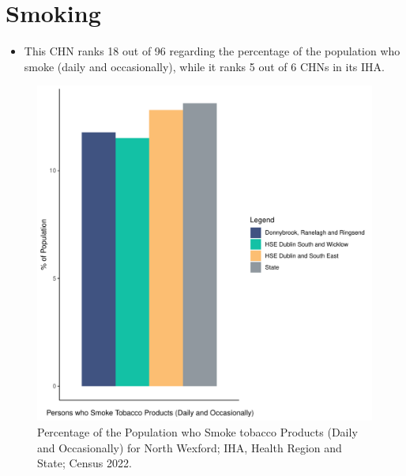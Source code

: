 \documentclass{article}
\begin{document}
\pagebreak

\section{Smoking}\label{sect:Smoking}
\begin{itemize}
\item This CHN ranks  18 out of 96 regarding the percentage of the population who smoke (daily and occasionally), while it ranks   5 out of 6 CHNs in its IHA.
\end{itemize}
\begin{figure}[H]
	\centering
	\includegraphics[width = 120mm]{../figures/SmokingED.pdf}
	\caption{Percentage of the Population who Smoke tobacco Products (Daily and Occasionally) for North Wexford; IHA, Health Region and State; Census 2022.}
	\label{fig:2ae19629-1a6a-13a3-e055-000000000001}
	\end{figure}
	
\end{document}
